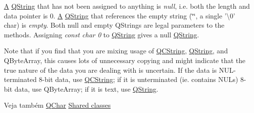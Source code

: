 \hyperlink{class_a}{A} \hyperlink{class_q_string}{Q\-String} that has not been assigned to anything is {\itshape null}, i.\-e. both the length and data pointer is 0. \hyperlink{class_a}{A} \hyperlink{class_q_string}{Q\-String} that references the empty string (\char`\"{}\char`\"{}, a single '\textbackslash{}0' char) is {\itshape empty}. Both null and empty Q\-Strings are legal parameters to the methods. Assigning {\itshape const char 0} to \hyperlink{class_q_string}{Q\-String} gives a null \hyperlink{class_q_string}{Q\-String}.

Note that if you find that you are mixing usage of \hyperlink{class_q_c_string}{Q\-C\-String}, \hyperlink{class_q_string}{Q\-String}, and Q\-Byte\-Array, this causes lots of unnecessary copying and might indicate that the true nature of the data you are dealing with is uncertain. If the data is N\-U\-L-\/terminated 8-\/bit data, use \hyperlink{class_q_c_string}{Q\-C\-String}; if it is unterminated (ie. contains N\-U\-Ls) 8-\/bit data, use Q\-Byte\-Array; if it is text, use \hyperlink{class_q_string}{Q\-String}.

\begin{DoxySeeAlso}{Veja também}
\hyperlink{class_q_char}{Q\-Char} \hyperlink{}{Shared classes} 
\end{DoxySeeAlso}



